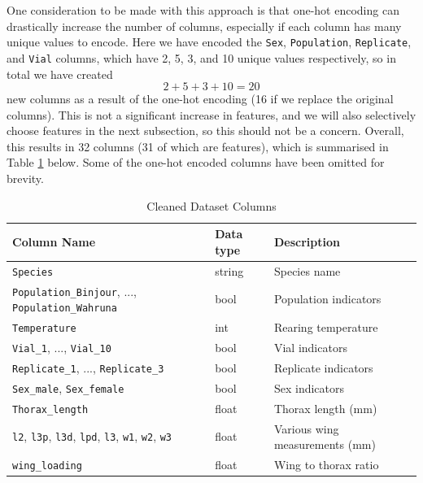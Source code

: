 One consideration to be made with this approach is that one-hot encoding can drastically increase the number of columns, especially if each column has many unique values to encode. Here we have encoded the \texttt{Sex}, \texttt{Population}, \texttt{Replicate}, and \texttt{Vial} columns, which have 2, 5, 3, and 10 unique values respectively, so in total we have created
\[
    2 + 5 + 3 + 10 = 20
\]
new columns as a result of the one-hot encoding (16 if we replace the original columns). This is not a significant increase in features, and we will also selectively choose features in the next subsection, so this should not be a concern. Overall, this results in 32 columns (31 of which are features), which is summarised in Table \ref{datasetcolumns} below. Some of the one-hot encoded columns have been omitted for brevity.

\begin{table}[!ht]
\begin{center}
\begin{tabular}{|l|l|l|}
\hline
Column Name                                                                                               & Data type & Description                    \\ \hline \hline
\texttt{Species}                                                                                          & string    & Species name                   \\ \hline
\texttt{Population\_Binjour}, ..., \texttt{Population\_Wahruna}                                           & bool      & Population indicators          \\ \hline
\texttt{Temperature}                                                                                      & int       & Rearing temperature            \\ \hline
\texttt{Vial\_1}, ..., \texttt{Vial\_10}                                                                  & bool      & Vial indicators                \\ \hline
\texttt{Replicate\_1}, ..., \texttt{Replicate\_3}                                                         & bool      & Replicate indicators           \\ \hline
\texttt{Sex\_male}, \texttt{Sex\_female}                                                                  & bool      & Sex indicators                 \\ \hline
\texttt{Thorax\_length}                                                                                   & float     & Thorax length (mm)             \\ \hline
\texttt{l2}, \texttt{l3p}, \texttt{l3d}, \texttt{lpd}, \texttt{l3}, \texttt{w1}, \texttt{w2}, \texttt{w3} & float     & Various wing measurements (mm) \\ \hline
\texttt{wing\_loading}                                                                                    & float     & Wing to thorax ratio           \\ \hline
\end{tabular}
\end{center}
\caption{Cleaned Dataset Columns}
\label{datasetcolumns}
\end{table}

